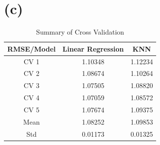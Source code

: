 \section*{(c)}

\begin{table}[htb]
 \caption{Summary of Cross Validation} \label{result}
 \vspace{0.1in}
\begin{center}
  \begin{tabular}{  c  c  c}
    \hline
    RMSE/Model        & Linear Regression        & KNN     \\ \hline
    CV 1                     & 1.10348                           & 1.12234 \\ \hline
    CV 2                    & 1.08674                           & 1.10264 \\ \hline
    CV 3                    & 1.07505                           & 1.08820 \\ \hline
    CV 4                    & 1.07059                           & 1.08572 \\ \hline
    CV 5                    & 1.07674                           & 1.09375 \\ \hline
    Mean                   & 1.08252                           &  1.09853 \\ \hline 
    Std                      &  0.01173                           &  0.01325 \\ \hline 
  \end{tabular}
\end{center}
\end{table}


\clearpage

%
%
%



